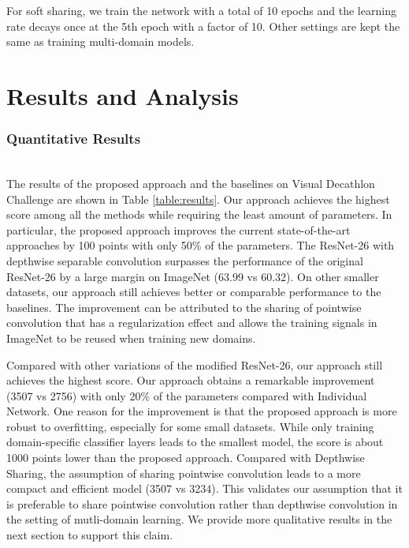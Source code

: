 \documentclass[letterpaper]{article} \usepackage{aaai19}  \usepackage{times}  \usepackage{helvet}  \usepackage{courier}  \usepackage{url}  \usepackage{graphicx}  \usepackage{amssymb}
\begin{document}
For soft sharing, we train the network with a total of 10 epochs and the learning rate decays once at the 5th epoch with a factor of 10. Other settings are kept the same as training multi-domain models.

\section{Results and Analysis}

\subsubsection{Quantitative Results} ~\\
The results of the proposed approach and the baselines on Visual Decathlon Challenge are shown in Table \ref{table:results}. Our approach achieves the highest score among all the methods while requiring the least amount of parameters. In particular, the proposed approach improves the current state-of-the-art approaches by 100 points with only 50\% of the parameters. The ResNet-26 with depthwise separable convolution surpasses the performance of the original ResNet-26 by a large margin on ImageNet (63.99 vs 60.32). On other smaller datasets, our approach still achieves better or comparable performance to the baselines. The improvement can be attributed to  the sharing of pointwise convolution that has a regularization effect and allows the training signals in ImageNet to be reused when training new domains.

Compared with other variations of the modified ResNet-26, our approach still achieves the highest score. Our approach obtains a remarkable improvement (3507 vs 2756) with only 20\% of the parameters compared with Individual Network. One reason for the improvement is that the proposed approach is more robust to overfitting, especially for some small datasets. While only training domain-specific classifier layers leads to the smallest model, the score is about 1000 points lower than the proposed approach. Compared with Depthwise Sharing, the assumption of sharing pointwise convolution leads to a more compact and efficient model (3507 vs 3234). This validates our assumption that it is preferable to share pointwise convolution rather than depthwise convolution in the setting of mutli-domain learning. We provide more qualitative results in the next section to support this claim. 
\end{document}

